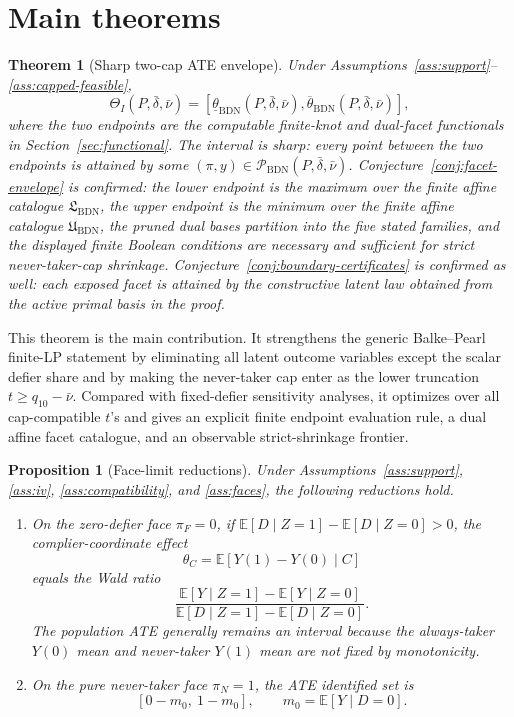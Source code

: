 \documentclass[11pt]{article}
\newcommand{\E}{\mathbb{E}}
\theoremstyle{definition}
\theoremstyle{plain}
\newtheorem{theorem}{Theorem}
\newtheorem{proposition}{Proposition}
\theoremstyle{remark}
\begin{document}
\section{Main theorems}
\begin{theorem}[Sharp two-cap ATE envelope]\label{thm:sharp-envelope}
Under Assumptions~\ref{ass:support}--\ref{ass:capped-feasible},
\[
\Theta_I(P,\bar\delta,\bar\nu)=
\left[
\underline\theta_{\mathrm{BDN}}(P,\bar\delta,\bar\nu),
\overline\theta_{\mathrm{BDN}}(P,\bar\delta,\bar\nu)
\right],
\]
where the two endpoints are the computable finite-knot and dual-facet
functionals in
Section~\ref{sec:functional}.  The interval is sharp: every point between the
two endpoints is attained by some
\((\pi,y)\in\mathcal{P}_{\mathrm{BDN}}(P,\bar\delta,\bar\nu)\).
Conjecture~\ref{conj:facet-envelope} is confirmed: the lower endpoint is the
maximum over the finite affine catalogue
\(\mathfrak{L}_{\mathrm{BDN}}\), the upper endpoint is the minimum over the
finite affine catalogue \(\mathfrak{U}_{\mathrm{BDN}}\), the pruned dual bases
partition into the five stated families, and the displayed finite Boolean
conditions are necessary and sufficient for strict never-taker-cap shrinkage.
Conjecture~\ref{conj:boundary-certificates} is confirmed as well: each exposed
facet is attained by the constructive latent law obtained from the active
primal basis in the proof.
\end{theorem}

This theorem is the main contribution.  It strengthens the generic
Balke--Pearl finite-LP statement by eliminating all latent outcome variables
except the scalar defier share and by making the never-taker cap enter as the
lower truncation \(t\ge q_{10}-\bar\nu\).  Compared with fixed-defier
sensitivity analyses, it optimizes over all cap-compatible \(t\)'s and gives
an explicit finite endpoint evaluation rule, a dual affine facet catalogue,
and an observable strict-shrinkage frontier.

\begin{proposition}[Face-limit reductions]\label{prop:face-limits}
Under Assumptions~\ref{ass:support}, \ref{ass:iv}, \ref{ass:compatibility}, and
\ref{ass:faces}, the following reductions hold.
\begin{enumerate}[label=(\roman*)]
\item On the zero-defier face \(\pi_F=0\), if
\(\E[D\mid Z=1]-\E[D\mid Z=0]>0\), the complier-coordinate effect
\[
\theta_C=\E[Y(1)-Y(0)\mid C]
\]
equals the Wald ratio
\[
\frac{\E[Y\mid Z=1]-\E[Y\mid Z=0]}
     {\E[D\mid Z=1]-\E[D\mid Z=0]}.
\]
The population ATE generally remains an interval because the always-taker
\(Y(0)\) mean and never-taker \(Y(1)\) mean are not fixed by monotonicity.
\item On the pure never-taker face \(\pi_N=1\), the ATE identified set is
\[
[0-m_0,\ 1-m_0],\qquad m_0=\E[Y\mid D=0].
\]
\end{enumerate}
\end{proposition}
\end{document}
